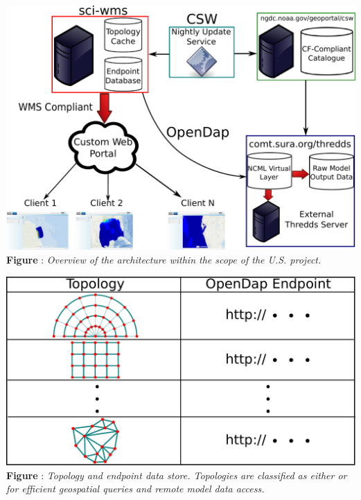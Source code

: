 \documentclass[noback,noborder,portrait,twocolumn]{cuposter}
\begin{document}
\begin{minipage}[r]{\linewidth}
  \centering
  \includegraphics[width=\linewidth]{../figs/overview.pdf}
  \captionspace{}
  \textbf{Figure \getIncFigcounter{}}: \textit{Overview of the \sciwms{} architecture within the scope of the U.S. \ioos{} \comt{} project.}
\end{minipage}

\begin{minipage}[t]{\linewidth}
  \centering
  \includegraphics[width=\linewidth]{../figs/sciwms_db_topology_endpoints.pdf}
  \textbf{Figure \getIncFigcounter{}}: \textit{Topology and endpoint data store. Topologies are classified as either \cgrid{} or \ugrid{} for efficient geospatial queries and remote model data access.}
\end{minipage}
\end{document}
